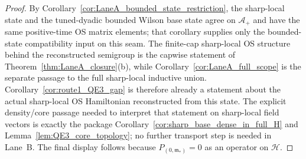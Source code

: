 \begin{proof}
By Corollary~\ref{cor:LaneA_bounded_state_restriction}, the sharp-local state and the tuned-dyadic bounded Wilson base state agree on $\mathcal A_+$ and have the same positive-time OS matrix elements; that corollary supplies only the bounded-state compatibility input on this seam.
The finite-cap sharp-local OS structure behind the reconstructed semigroup is the capwise statement of Theorem~\ref{thm:LaneA_closure}(b), while Corollary~\ref{cor:LaneA_full_scope} is the separate passage to the full sharp-local inductive union.
Corollary~\ref{cor:route1_QE3_gap} is therefore already a statement about the actual sharp-local OS Hamiltonian reconstructed from this state.
The explicit density/core passage needed to interpret that statement on sharp-local field vectors is exactly the package Corollary~\ref{cor:sharp_base_dense_in_full_H} and Lemma~\ref{lem:QE3_core_topology}; no further transport step is needed in Lane~B.
The final display follows because $P_{(0,\mathfrak m_\ast)}=0$ as an operator on $\mathcal H$.
\end{proof}
